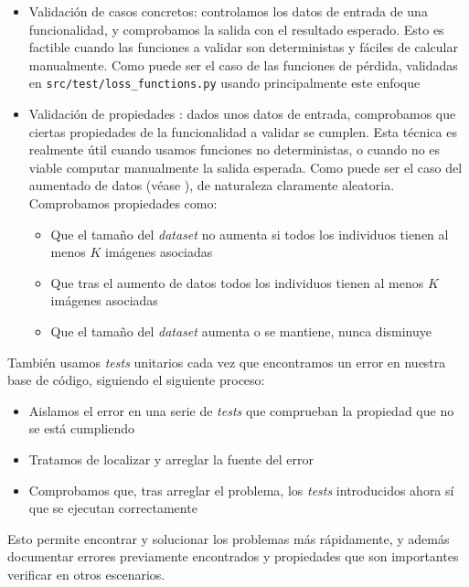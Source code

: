 \begin{itemize}
    \item Validación de casos concretos: controlamos los datos de entrada de una funcionalidad, y comprobamos la salida con el resultado esperado. Esto es factible cuando las funciones a validar son deterministas y fáciles de calcular manualmente. Como puede ser el caso de las funciones de pérdida, validadas en \lstinline{src/test/loss_functions.py} usando principalmente este enfoque
    \item Validación de propiedades \cite{informatica:property_based_testing}: dados unos datos de entrada, comprobamos que ciertas propiedades de la funcionalidad a validar se cumplen. Esta técnica es realmente útil cuando usamos funciones no deterministas, o cuando no es viable computar manualmente la salida esperada. Como puede ser el caso del aumentado de datos (véase ), de naturaleza claramente aleatoria. Comprobamos propiedades como:

    \begin{itemize}
        \item Que el tamaño del \textit{dataset} no aumenta si todos los individuos tienen al menos $K$ imágenes asociadas
        \item Que tras el aumento de datos todos los individuos tienen al menos $K$ imágenes asociadas
        \item Que el tamaño del \textit{dataset} aumenta o se mantiene, nunca disminuye
    \end{itemize}

\end{itemize}

También usamos \textit{tests} unitarios cada vez que encontramos un error en nuestra base de código, siguiendo el siguiente proceso:

\begin{itemize}
    \item Aislamos el error en una serie de \textit{tests} que comprueban la propiedad que no se está cumpliendo
    \item Tratamos de localizar y arreglar la fuente del error
    \item Comprobamos que, tras arreglar el problema, los \textit{tests} introducidos ahora sí que se ejecutan correctamente
\end{itemize}

Esto permite encontrar y solucionar los problemas más rápidamente, y además documentar errores previamente encontrados y propiedades que son importantes verificar en otros escenarios.


